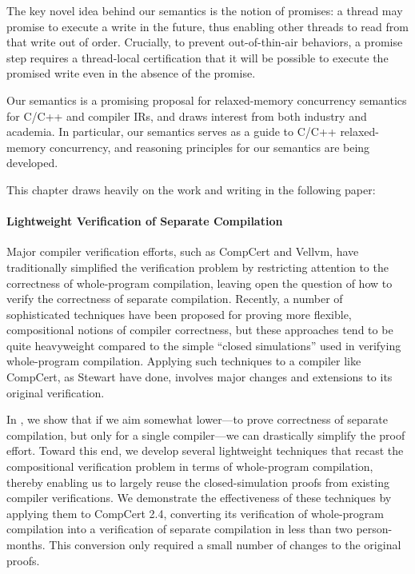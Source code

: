 The key novel idea behind our semantics is the notion of promises: a thread may promise to execute a
write in the future, thus enabling other threads to read from that write out of order.  Crucially,
to prevent out-of-thin-air behaviors, a promise step requires a thread-local certification that it
will be possible to execute the promised write even in the absence of the promise.

Our semantics is a promising proposal for relaxed-memory concurrency semantics for C/C++ and
compiler IRs, and draws interest from both industry and academia.  In particular, our semantics
serves as a guide to C/C++ relaxed-memory concurrency, and reasoning principles for our semantics
are being developed.

This chapter draws heavily on the work and writing in the following paper:



\paragraph{Lightweight Verification of Separate Compilation}

Major compiler verification efforts, such as CompCert and Vellvm, have traditionally simplified the
verification problem by restricting attention to the correctness of whole-program compilation,
leaving open the question of how to verify the correctness of separate compilation.  Recently, a
number of sophisticated techniques have been proposed for proving more flexible, compositional
notions of compiler correctness, but these approaches tend to be quite heavyweight compared to the
simple ``closed simulations'' used in verifying whole-program compilation.  Applying such techniques
to a compiler like CompCert, as Stewart \etal{} have done, involves major changes and extensions to
its original verification.

In , we show that if we aim somewhat lower---to prove correctness of separate
compilation, but only for a single compiler---we can drastically simplify the proof effort.  Toward
this end, we develop several lightweight techniques that recast the compositional verification
problem in terms of whole-program compilation, thereby enabling us to largely reuse the
closed-simulation proofs from existing compiler verifications.  We demonstrate the effectiveness of
these techniques by applying them to CompCert 2.4, converting its verification of whole-program
compilation into a verification of separate compilation in less than two person-months.  This
conversion only required a small number of changes to the original proofs.

